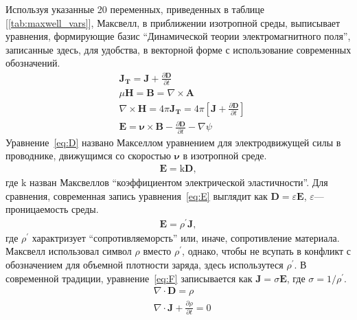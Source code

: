 \documentclass[12pt, oneside, a4paper]{article}
\begin{document}
Используя указанные 20 переменных, приведенных в таблице [\ref{tab:maxwell_vars}], Максвелл, в приближении изотропной среды, выписывает уравнения, формирующие базис ``Динамической теории электромагнитного поля'', записанные здесь, для удобства, в векторной форме с использование современных обозначений.
\begin{align}
&\mathbf{J_T}=\mathbf{J}+\frac{\partial{\mathbf{D}}}{\partial{t}}\label{eq:A}\\
&\mu\mathbf{H} = \mathbf{B} = \nabla\times\mathbf{A}\label{eq:B}\\
&\nabla\times\mathbf{H}=4\pi\mathbf{J_T}=4\pi\left[\mathbf{J}+\frac{\partial{\mathbf{D}}}{\partial{t}}\right]\label{eq:C}\\
&\mathbf{E}=\boldsymbol\nu\times\mathbf{B} - \frac{\partial{\mathbf{D}}}{\partial{t}} - \nabla\psi\label{eq:D}
\end{align}
Уравнение~\eqref{eq:D} названо Макселлом уравнением для электродвижущей силы в проводнике, движущимся со скоростью $\boldsymbol\nu$ в изотропной среде.
\begin{align}
\mathbf{E}=\mathrm{k}\mathbf{D},\label{eq:E}
\end{align}
где $\mathrm{k}$ назван Максвеллов ``коэффициентом электрической эластичности''. Для сравнения, современная запись уравнения~\eqref{eq:E} выглядит как $\mathbf{D}=\varepsilon\mathbf{E}$, $\varepsilon$---проницаемость среды.
\begin{align}
\mathbf{E}=\rho^{'}\mathbf{J},\label{eq:F}
\end{align}
где $\rho^{'}$ характризует ``сопротивляеморсть'' или, иначе, сопротивление материала. Максвелл использовал символ $\rho$ вместо $\rho^{'}$, однако, чтобы не всупать в конфликт с обозначением для объемной плотности заряда, здесь использутеся $\rho^{'}$. В современной традиции, уравнение~\eqref{eq:F} записывается как $\mathbf{J}=\sigma\mathbf{E}$, где $\sigma=1/\rho^{'}$.
\begin{align}
&\nabla\cdot\mathbf{D}=\rho\label{eq:G}\\
&\nabla\cdot\mathbf{J}+\frac{\partial{\rho}}{\partial{t}}=0\label{eq:H}
\end{align}
\end{document}
